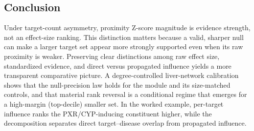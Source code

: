 \subsection{Conclusion}

Under target-count asymmetry, proximity Z-score magnitude is evidence strength, not an effect-size ranking. This distinction matters because a valid, sharper null can make a larger target set appear more strongly supported even when its raw proximity is weaker. Preserving clear distinctions among raw effect size, standardized evidence, and direct versus propagated influence yields a more transparent comparative picture. A degree-controlled liver-network calibration shows that the null-precision law holds for the module and its size-matched controls, and that material rank reversal is a conditional regime that emerges for a high-margin (top-decile) smaller set. In the worked example, per-target influence ranks the PXR/CYP-inducing constituent higher, while the decomposition separates direct target--disease overlap from propagated influence.
